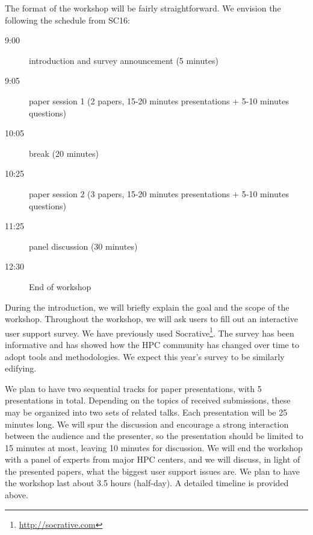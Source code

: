 \documentclass[a4paper,10pt]{article}
\begin{document}
The format of the workshop will be fairly straightforward. We envision the following the schedule from SC16:

\begin{description}
    \item[9:00] introduction and survey announcement (5 minutes)
    \item[9:05] paper session 1 (2 papers, 15-20 minutes presentations + 5-10 minutes questions)
    \item[10:05] break (20 minutes)
    \item[10:25] paper session 2 (3 papers, 15-20 minutes presentations + 5-10 minutes questions)
    \item[11:25] panel discussion  (30 minutes)
	\item[12:30] End of workshop
\end{description}


During the introduction, we will briefly explain the goal and the scope of the
workshop.%
%
Throughout the workshop, we will ask users to fill out an interactive user support
survey. We have previously used Socrative\footnote{\url{http://socrative.com}}. 
The survey has been informative and has showed how the HPC community has changed
over time to adopt tools and methodologies. We expect this year's survey to be 
similarly edifying.

We plan to have two sequential tracks for paper presentations, with 5 presentations
in total. Depending on the topics of received submissions, these may be organized
into two sets of related talks. Each presentation will be 25 minutes long.
We will spur the discussion and encourage a strong interaction between the 
audience and the presenter, so the presentation should be limited to 15 minutes at
most, leaving 10 minutes for discussion.
%
We will end the workshop with a panel of experts from major HPC centers, and we will
discuss, in light of the presented papers, what the biggest user support issues are.
We plan to have the workshop last about 3.5 hours (half-day).
A detailed timeline is provided above.
\end{document}
